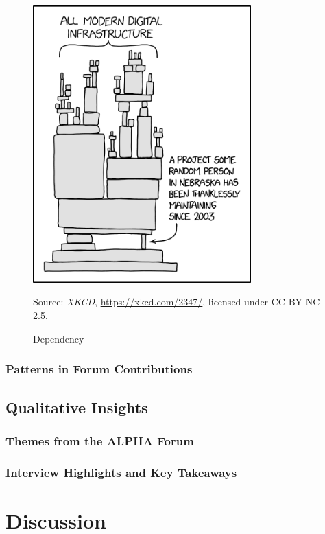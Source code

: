 \documentclass{article}
\begin{document}
\begin{figure}[h!] 
    \centering
    \includegraphics[width=0.75\textwidth]{dependency.png} 
    \caption{Dependency}
    \label{fig:dependency_comic}
    \small Source: \textit{XKCD}, \url{https://xkcd.com/2347/}, licensed under CC BY-NC 2.5.
\end{figure}

\subsubsection{Patterns in Forum Contributions}

\subsection{Qualitative Insights}
\subsubsection{Themes from the ALPHA Forum}
\subsubsection{Interview Highlights and Key Takeaways}

\section{Discussion}
\end{document}
